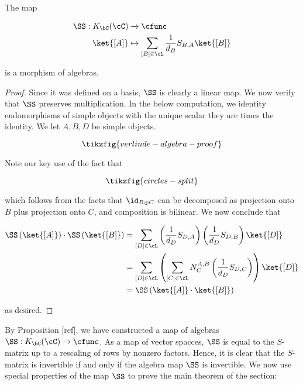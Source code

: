 \begin{prop} The map

\begin{align*}
\SS:K_{\bC}(\cC)&\xrightarrow{} \cfunc\\
\ket{[A]}&\mapsto \sum_{[B]\in \cL}\frac{1}{d_B}S_{B,A}\ket{[B]}
\end{align*}

is a morphism of algebras.
\end{prop}
\begin{proof} Since it was defined on a basis, $\SS$ is clearly a linear map. We now verify that $\SS$ preserves multiplication. In the below computation, we identity endomorphisms of simple objects with the unique scalar they are times the identity. We let $A,B,D$ be simple objects.

\begin{equation*}
\tikzfig{verlinde-algebra-proof}
\end{equation*}

Note our key use of the fact that

\begin{equation*}
\tikzfig{circles-split}
\end{equation*}

which follows from the facts that $\id_{B\oplus C}$ can be decomposed as projection onto $B$ plus projection onto $C$, and composition is bilinear. We now conclude that

\begin{align*}
\SS\left(\ket{[A]}\right)\cdot \SS\left(\ket{[B]}\right) &= \sum_{[D]\in\cL} \left(\frac{1}{d_D}S_{D,A}\right)\left(\frac{1}{d_D}S_{D,B}\right) \ket{[D]}\\
&= \sum_{[D]\in \cL} \left(\sum_{[C]\in \cL}N^{A,B}_{C} \left(\frac{1}{d_D}S_{D,C}\right)\right)\ket{[D]}\\
&= \SS\left(\ket{[A]}\cdot \ket{[B]}\right)
\end{align*}

as desired.
\end{proof}


By Proposition [ref], we have constructed a map of algebras $\SS:K_{\bC}(\cC)\to \cfunc$. As a map of vector spacces, $\SS$ is equal to the $S$-matrix up to a rescaling of rows by nonzero factors. Hence, it is clear that the $S$-matrix is invertible if and only if the algebra map $\SS$ is invertible. We now use special properties of the map $\SS$ to prove the main theorem of the section:

